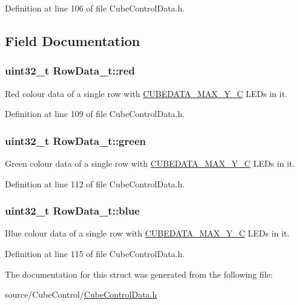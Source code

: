 Definition at line 106 of file Cube\+Control\+Data.\+h.



\subsection{Field Documentation}
\hypertarget{struct_row_data__t_a66675959c20cdf19aac77903a0b49e12}{}
\subsubsection[{red}]{\setlength{\rightskip}{0pt plus 5cm}uint32\+\_\+t Row\+Data\+\_\+t\+::red}\label{struct_row_data__t_a66675959c20cdf19aac77903a0b49e12}
Red colour data of a single row with \hyperlink{_cube_control_data_8h_ad81929089053d6c5d380dbbce3832272}{C\+U\+B\+E\+D\+A\+T\+A\+\_\+\+M\+A\+X\+\_\+\+Y\+\_\+\+C} L\+E\+Ds in it. 

Definition at line 109 of file Cube\+Control\+Data.\+h.

\hypertarget{struct_row_data__t_a67b2254f618fa4fc2a513eed8e3364c5}{}
\subsubsection[{green}]{\setlength{\rightskip}{0pt plus 5cm}uint32\+\_\+t Row\+Data\+\_\+t\+::green}\label{struct_row_data__t_a67b2254f618fa4fc2a513eed8e3364c5}
Green colour data of a single row with \hyperlink{_cube_control_data_8h_ad81929089053d6c5d380dbbce3832272}{C\+U\+B\+E\+D\+A\+T\+A\+\_\+\+M\+A\+X\+\_\+\+Y\+\_\+\+C} L\+E\+Ds in it. 

Definition at line 112 of file Cube\+Control\+Data.\+h.

\hypertarget{struct_row_data__t_a29e3f443c5daba5fa2aa51337b485bcb}{}
\subsubsection[{blue}]{\setlength{\rightskip}{0pt plus 5cm}uint32\+\_\+t Row\+Data\+\_\+t\+::blue}\label{struct_row_data__t_a29e3f443c5daba5fa2aa51337b485bcb}
Blue colour data of a single row with \hyperlink{_cube_control_data_8h_ad81929089053d6c5d380dbbce3832272}{C\+U\+B\+E\+D\+A\+T\+A\+\_\+\+M\+A\+X\+\_\+\+Y\+\_\+\+C} L\+E\+Ds in it. 

Definition at line 115 of file Cube\+Control\+Data.\+h.



The documentation for this struct was generated from the following file\+:\begin{DoxyCompactItemize}
\item 
source/\+Cube\+Control/\hyperlink{_cube_control_data_8h}{Cube\+Control\+Data.\+h}\end{DoxyCompactItemize}
